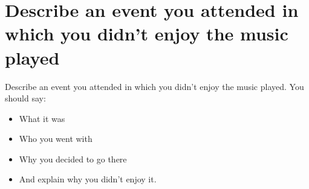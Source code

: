 \section{Describe an event you attended in which you didn't enjoy the music played}
\begin{ieltsprompt}
Describe an event you attended in which you didn't enjoy the music played.
You should say:
\begin{itemize}[leftmargin=2em, itemsep=2pt]
\item What it was
\item Who you went with
\item Why you decided to go there
\item And explain why you didn't enjoy it.
\end{itemize}
\end{ieltsprompt}
